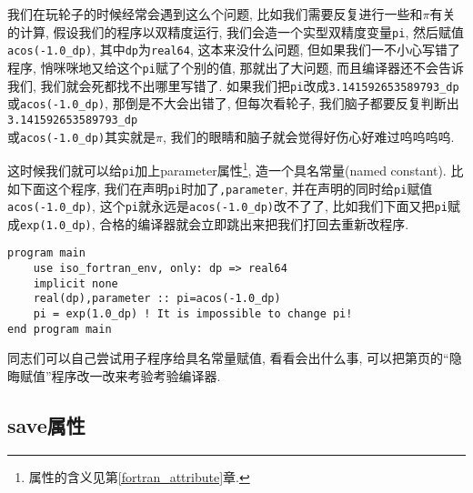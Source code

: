 我们在玩轮子的时候经常会遇到这么个问题, 比如我们需要反复进行一些和$\pi$有关的计算, 假设我们的程序以双精度运行, 我们会造一个实型双精度变量\verb|pi|, 然后赋值\verb|acos(-1.0_dp)|, 其中\verb|dp|为\verb|real64|, 这本来没什么问题, 但如果我们一不小心写错了程序, 悄咪咪地又给这个\verb|pi|赋了个别的值, 那就出了大问题, 而且编译器还不会告诉我们, 我们就会死都找不出哪里写错了. 如果我们把\verb|pi|改成\verb|3.141592653589793_dp|或\verb|acos(-1.0_dp)|, 那倒是不大会出错了, 但每次看轮子, 我们脑子都要反复判断出\verb|3.141592653589793_dp|\\或\verb|acos(-1.0_dp)|其实就是$\pi$, 我们的眼睛和脑子就会觉得好伤心好难过呜呜呜呜.

这时候我们就可以给\verb|pi|加上parameter属性\footnote{属性的含义见第\ref{fortran_attribute}章.}, 造一个具名常量(named constant). 比如下面这个程序, 我们在声明\verb|pi|时加了\verb|,parameter|, 并在声明的同时给\verb|pi|赋值\verb|acos(-1.0_dp)|, 这个\verb|pi|就永远是\verb|acos(-1.0_dp)|改不了了, 比如我们下面又把\verb|pi|赋成\verb|exp(1.0_dp)|, 合格的编译器就会立即跳出来把我们打回去重新改程序.
\begin{verbatim}
program main
    use iso_fortran_env, only: dp => real64
    implicit none
    real(dp),parameter :: pi=acos(-1.0_dp)
    pi = exp(1.0_dp) ! It is impossible to change pi!
end program main
\end{verbatim}
同志们可以自己尝试用子程序给具名常量赋值, 看看会出什么事, 可以把第\pageref{secret_assignment}页的``隐晦赋值''程序改一改来考验考验编译器.

\subsection{save属性}


